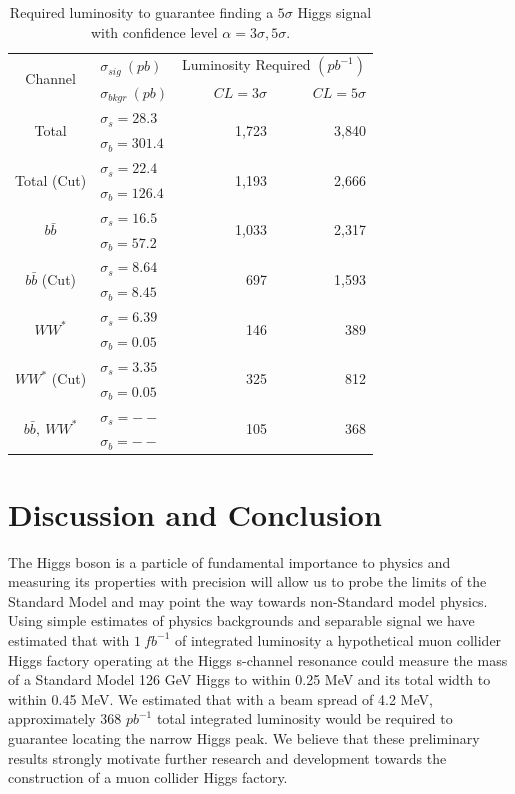\documentclass[a4paper]{article}
\begin{document}
\begin{table}
	\begin{tabular}{|c|l|r|r|}
		\hline
		\multirow{2}{*}{Channel}	& $\sigma_{sig}\ (pb)$	& \multicolumn{2}{|c|}{Luminosity Required $(pb^{-1})$} \\ \cline{3-4}
		& $\sigma_{bkgr}\ (pb)$	& $CL = 3\sigma$ & $CL = 5\sigma$ \\ \hline
		\multirow{2}{*}{Total} & $\sigma_s = 28.3$ & 
			\multirow{2}{*}{1,723}	& \multirow{2}{*}{3,840} \\
			& $\sigma_b = 301.4$	&	& \\ \hline
		\multirow{2}{*}{Total (Cut)} & $\sigma_s = 22.4$ & 
			\multirow{2}{*}{1,193}	& \multirow{2}{*}{2,666} \\
			& $\sigma_b = 126.4$	&	& \\ \hline
		\multirow{2}{*}{$b\bar{b}$} & $\sigma_s = 16.5$ & 
			\multirow{2}{*}{1,033}	& \multirow{2}{*}{2,317} \\
			& $\sigma_b= 57.2$	&	& \\ \hline
		\multirow{2}{*}{$b\bar{b}$ (Cut)} & $\sigma_s = 8.64$ & 
			\multirow{2}{*}{697}	& \multirow{2}{*}{1,593} \\
			& $\sigma_b= 8.45$	&	& \\ \hline
		\multirow{2}{*}{$WW^*$} & $\sigma_s = 6.39$ & 
			\multirow{2}{*}{146}	& \multirow{2}{*}{389} \\
			& $\sigma_b= 0.05$	&	& \\ \hline
		\multirow{2}{*}{$WW^*$ (Cut)} & $\sigma_s = 3.35$ & 
			\multirow{2}{*}{325}	& \multirow{2}{*}{812} \\
			& $\sigma_b= 0.05$	&	& \\ \hline
		\multirow{2}{*}{$b\bar{b},\ WW^*$} & $\sigma_s = --$ & 
			\multirow{2}{*}{105}	& \multirow{2}{*}{368} \\
			& $\sigma_b= --$	&	& \\ \hline
	\end{tabular}
	\caption{Required luminosity to guarantee finding a $5\sigma$ Higgs signal with confidence level $\alpha=3\sigma,5\sigma$.\label{table:lum-needed}} 
\end{table}

\section{Discussion and Conclusion}
The Higgs boson is a particle of fundamental importance to physics and measuring its properties with precision will allow us to probe the limits of the Standard Model and may point the way towards non-Standard model physics. Using simple estimates of physics backgrounds and separable signal we have estimated that with $1~fb^{-1}$ of integrated luminosity a hypothetical muon collider Higgs factory operating at the Higgs s-channel resonance could measure the mass of a Standard Model 126 GeV Higgs to within 0.25 MeV and its total width to within 0.45 MeV. We estimated that with a beam spread of 4.2 MeV, approximately 368 $pb^{-1}$ total integrated luminosity would be required to guarantee locating the narrow Higgs peak. We believe that these preliminary results strongly motivate further research and development towards the construction of a muon collider Higgs factory.
\end{document}
